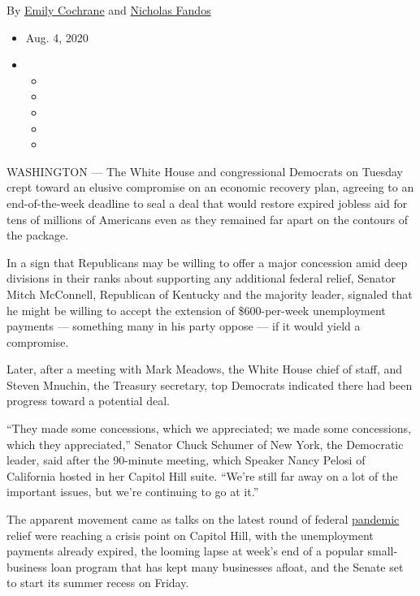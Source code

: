 By \href{https://www.nytimes3xbfgragh.onion/by/emily-cochrane}{Emily
Cochrane} and
\href{https://www.nytimes3xbfgragh.onion/by/nicholas-fandos}{Nicholas
Fandos}

\begin{itemize}
\item
  Aug. 4, 2020
\item
  \begin{itemize}
  \item
  \item
  \item
  \item
  \item
  \end{itemize}
\end{itemize}

WASHINGTON --- The White House and congressional Democrats on Tuesday
crept toward an elusive compromise on an economic recovery plan,
agreeing to an end-of-the-week deadline to seal a deal that would
restore expired jobless aid for tens of millions of Americans even as
they remained far apart on the contours of the package.

In a sign that Republicans may be willing to offer a major concession
amid deep divisions in their ranks about supporting any additional
federal relief, Senator Mitch McConnell, Republican of Kentucky and the
majority leader, signaled that he might be willing to accept the
extension of \$600-per-week unemployment payments --- something many in
his party oppose --- if it would yield a compromise.

Later, after a meeting with Mark Meadows, the White House chief of
staff, and Steven Mnuchin, the Treasury secretary, top Democrats
indicated there had been progress toward a potential deal.

``They made some concessions, which we appreciated; we made some
concessions, which they appreciated,'' Senator Chuck Schumer of New
York, the Democratic leader, said after the 90-minute meeting, which
Speaker Nancy Pelosi of California hosted in her Capitol Hill suite.
``We're still far away on a lot of the important issues, but we're
continuing to go at it.''

The apparent movement came as talks on the latest round of federal
\href{https://www.nytimes3xbfgragh.onion/interactive/2020/us/coronavirus-us-cases.html}{pandemic}
relief were reaching a crisis point on Capitol Hill, with the
unemployment payments already expired, the looming lapse at week's end
of a popular small-business loan program that has kept many businesses
afloat, and the Senate set to start its summer recess on Friday.

